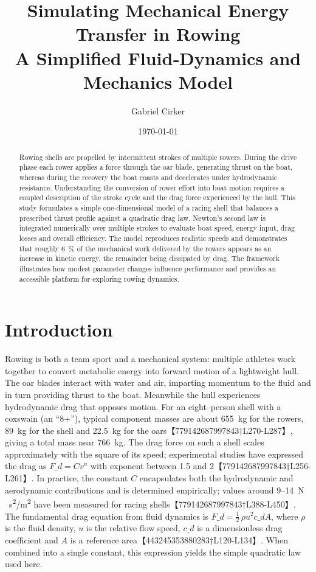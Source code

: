 \documentclass[11pt]{article}
\title{Simulating Mechanical Energy Transfer in Rowing\large\\A Simplified Fluid‑Dynamics and Mechanics Model}
\author{Gabriel Cirker}
\date{\today}
\begin{document}
\maketitle

\begin{abstract}
Rowing shells are propelled by intermittent strokes of multiple rowers.  During
the drive phase each rower applies a force through the oar blade, generating
thrust on the boat, whereas during the recovery the boat coasts and decelerates
under hydrodynamic resistance.  Understanding the conversion of rower effort
into boat motion requires a coupled description of the stroke cycle and the
drag force experienced by the hull.  This study formulates a simple one‑dimensional
model of a racing shell that balances a prescribed thrust profile against a
quadratic drag law.  Newton’s second law is integrated numerically over
multiple strokes to evaluate boat speed, energy input, drag losses and overall
efficiency.  The model reproduces realistic speeds and demonstrates that
roughly 6~\% of the mechanical work delivered by the rowers appears as an
increase in kinetic energy, the remainder being dissipated by drag.  The
framework illustrates how modest parameter changes influence performance and
provides an accessible platform for exploring rowing dynamics.
\end{abstract}

\section{Introduction}

Rowing is both a team sport and a mechanical system: multiple athletes work
together to convert metabolic energy into forward motion of a lightweight hull.
The oar blades interact with water and air, imparting momentum to the fluid
and in turn providing thrust to the boat.  Meanwhile the hull experiences
hydrodynamic drag that opposes motion.  For an eight–person shell with a
coxswain (an “8+”), typical component masses are about \SI{655}{\kilogram}
for the rowers, \SI{89}{\kilogram} for the shell and \SI{22.5}{\kilogram}
for the oars【779142687997843†L270-L287】, giving a total mass near
\SI{766}{\kilogram}.  The drag force on such a shell scales approximately
with the square of its speed; experimental studies have expressed the drag as
\(F\_d = C v^n\) with exponent between 1.5 and 2【779142687997843†L256-L261】.
In practice, the constant \(C\) encapsulates both the hydrodynamic and
aerodynamic contributions and is determined empirically; values around
9--14 \si{N\,s^2/m^2} have been measured for racing shells【779142687997843†L388-L450】.
The fundamental drag equation from fluid dynamics is
\(F\_d = \tfrac{1}{2}\,\rho u^2 c\_d A\), where \(\rho\) is the fluid
density, \(u\) is the relative flow speed, \(c\_d\) is a dimensionless drag
coefficient and \(A\) is a reference area【443245353880283†L120-L134】.  When
combined into a single constant, this expression yields the simple quadratic
law used here.
\end{document}
